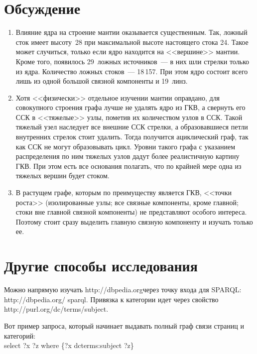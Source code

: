 \begin{multicols}{2}
\section{Обсуждение}

   \noindent
   \begin{enumerate}[1.]
   \item Влияние ядра на строение мантии оказывается существенным. Так, ложный сток 
имеет высоту~28 при максимальной высоте настоящего стока 24. Такое может случиться, 
только если ядро находится на <<вершине>> мантии. Кроме того, появилось 29~ложных 
источников~--- в них шли стрелки только из ядра. Количество ложных стоков~--- 18\,157. 
При этом ядро состоит всего лишь из одной большой связной компоненты и 19~линз.
   \item Хотя <<физически>> отдельное изучении мантии оправдано, для совокупного 
строения графа лучше не удалять ядро из ГКВ, а свернуть его ССК в <<тяжелые>> узлы, 
пометив их количеством узлов в ССК. Такой тяжелый узел наследует все внешние ССК 
стрелки, а образовавшиеся петли внутренних стрелок стоит удалить. Тогда получится 
ациклический граф, так как ССК не могут образовывать цикл. Уровни такого графа с 
указанием распределения по ним тяжелых узлов дадут более реалистичную картину ГКВ. 
При этом есть все основания полагать, что по крайней мере одна из тяжелых вершин будет 
стоком.
   \item В растущем графе, которым по преимуществу является ГКВ, <<точки роста>> 
(изолированные узлы; все связные компоненты, кроме главной; стоки вне главной 
связной компоненты) не представляют 
особого интереса. Поэтому стоит сразу выделить главную связную компоненту 
и изучать только ее.
\end{enumerate}

\section{Другие способы исследования}

   Можно напрямую изучать {\sf http://dbpedia.org}\linebreak через точку входа для SPARQL: 
      {\sf 
http://dbpedia.org/ sparql}. Привязка к категории идет через свойство {\sf 
http://purl.org/dc/terms/subject}.
   
   Вот пример запроса, который начинает выдавать полный граф связи страниц и категорий:\\[-8pt]
   
   
{\sf select ?x ?z where \{?x dcterms:subject ?z\}}\\[-8pt]
   

\end{multicols}
